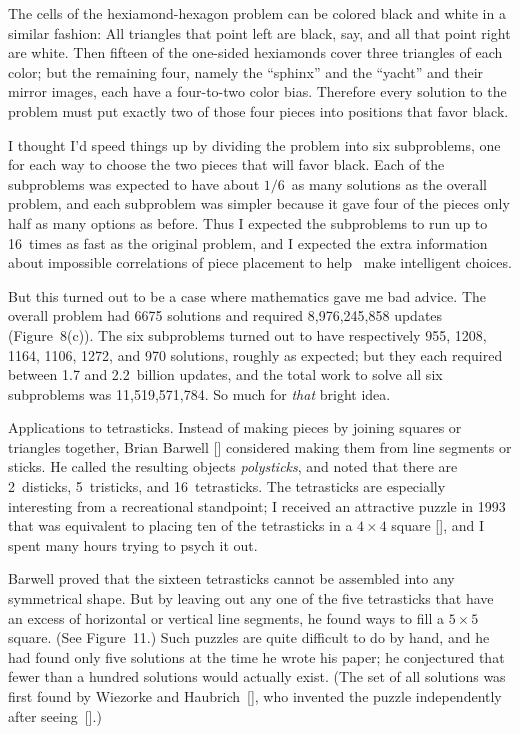The cells of the hexiamond-hexagon problem can be colored black and
white in a similar fashion: All triangles that point left are black,
say, and all that point right are white.  Then fifteen of the
one-sided hexiamonds cover three triangles of each color; but the
remaining four, namely the ``sphinx'' and the ``yacht'' and their
mirror images, each have a four-to-two color bias.  Therefore every
solution to the problem must put exactly two of those four pieces into
positions that favor black.

I thought I'd speed things up by dividing the problem into six
subproblems, one for each way to choose the two pieces that will favor
black.  Each of the subproblems was expected to have about $1/6$~as
many solutions as the overall problem, and each subproblem was simpler
because it gave four of the pieces only half as many options as
before.  Thus I expected the subproblems to run up to 16~times as fast
as the original problem, and I expected the extra information about
impossible correlations of piece placement to help \algoDLX\ make
intelligent choices.

But this turned out to be a case where mathematics gave me bad advice.
The overall problem had 6675 solutions and required
8{,}976{,}245{,}858 updates (Figure~8(c)).  The six subproblems turned
out to have respectively 955, 1208, 1164, 1106, 1272, and 970
solutions, roughly as expected; but they each required between 1.7 and
2.2~billion updates, and the total work to solve all six subproblems
was 11{,}519{,}571{,}784.  So much for {\it that\/} bright idea.

\newsection Applications to tetrasticks.
Instead of making pieces by joining squares or triangles together,
Brian Barwell [\B] considered making them from line segments or sticks.  He
called the resulting objects {\it polysticks}, and noted that there
are 2~disticks, 5~tristicks, and 16~tetrasticks.  The tetrasticks are
especially interesting from a recreational standpoint; I received an
attractive puzzle in 1993 that was equivalent to placing ten of the
tetrasticks in a $4\times4$ square [\TP], and I spent many hours
trying to psych it out.

Barwell proved that the sixteen tetrasticks cannot be assembled into
any symmetrical shape.  But by leaving out any one of the five
tetrasticks that have an excess of horizontal or vertical line
segments, he found ways to fill a $5\times5$ square.  (See Figure~11.)
Such puzzles are quite difficult to do by hand, and he had found only
five solutions at the time he wrote his paper; he conjectured that
fewer than a hundred solutions would actually exist.
(The set of all solutions was first found by Wiezorke and
Haubrich~[\WH], who invented the puzzle independently
after seeing~[\TP].)

